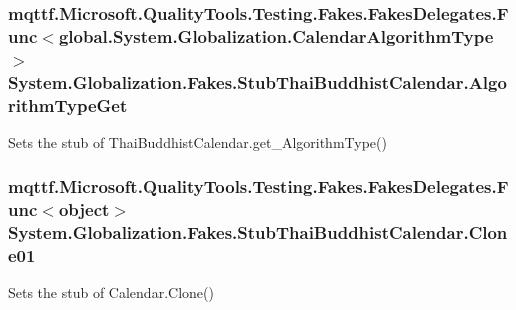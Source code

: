 \hypertarget{class_system_1_1_globalization_1_1_fakes_1_1_stub_thai_buddhist_calendar_a4a8bfce279e9901d0f76c3b01de53cf4}{
\subsubsection[{Algorithm\-Type\-Get}]{\setlength{\rightskip}{0pt plus 5cm}mqttf.\-Microsoft.\-Quality\-Tools.\-Testing.\-Fakes.\-Fakes\-Delegates.\-Func$<$global.\-System.\-Globalization.\-Calendar\-Algorithm\-Type$>$ System.\-Globalization.\-Fakes.\-Stub\-Thai\-Buddhist\-Calendar.\-Algorithm\-Type\-Get}}\label{class_system_1_1_globalization_1_1_fakes_1_1_stub_thai_buddhist_calendar_a4a8bfce279e9901d0f76c3b01de53cf4}


Sets the stub of Thai\-Buddhist\-Calendar.\-get\-\_\-\-Algorithm\-Type()

\hypertarget{class_system_1_1_globalization_1_1_fakes_1_1_stub_thai_buddhist_calendar_a60d64d3feabb016e466ed99c15ddce9e}{
\subsubsection[{Clone01}]{\setlength{\rightskip}{0pt plus 5cm}mqttf.\-Microsoft.\-Quality\-Tools.\-Testing.\-Fakes.\-Fakes\-Delegates.\-Func$<$object$>$ System.\-Globalization.\-Fakes.\-Stub\-Thai\-Buddhist\-Calendar.\-Clone01}}\label{class_system_1_1_globalization_1_1_fakes_1_1_stub_thai_buddhist_calendar_a60d64d3feabb016e466ed99c15ddce9e}


Sets the stub of Calendar.\-Clone()

